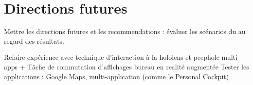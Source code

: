 \chapter{Directions futures}
\label{ch:futur_work}

Mettre les directions futures et les recommendations : évaluer les scénarios du  au regard des résultats.

Refaire expérience avec technique d'interaction à la hololens et peephole
multi-apps + Tâche de commutation d'affichages
bureau en realité augmentée
Tester les applications : Google Maps, multi-application (comme le Personal Cockpit)